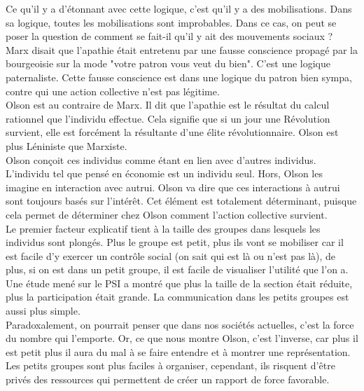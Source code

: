 \documentclass[10pt, a4paper, openany]{book}
\begin{document}
Ce qu'il y a d'étonnant avec cette logique, c'est qu'il y a des mobilisations. Dans sa logique, toutes les mobilisations sont improbables. Dans ce cas, on peut se poser la question de comment se fait-il qu'il y ait des mouvements sociaux ? \\
Marx disait que l'apathie était entretenu par une fausse conscience propagé par la bourgeoisie sur la mode "votre patron vous veut du bien". C'est une logique paternaliste. Cette fausse conscience est dans une logique du patron bien sympa, contre qui une action collective n'est pas légitime. \\
Olson est au contraire de Marx. Il dit que l'apathie est le résultat du calcul rationnel que l'individu effectue. Cela signifie que si un jour une Révolution survient, elle est forcément la résultante d'une élite révolutionnaire. Olson est plus Léniniste que Marxiste. \\
Olson conçoit ces individus comme étant en lien avec d'autres individus. L'individu tel que pensé en économie est un individu seul. Hors, Olson les imagine en interaction avec autrui. Olson va dire que ces interactions à autrui sont toujours basés sur l'intérêt. Cet élément est totalement déterminant, puisque cela permet de déterminer chez Olson comment l'action collective survient. \\
Le premier facteur explicatif tient à la taille des groupes dans lesquels les individus sont plongés. Plus le groupe est petit, plus ils vont se mobiliser car il est facile d'y exercer un contrôle social (on sait qui est là ou n'est pas là), de plus, si on est dans un petit groupe, il est facile de visualiser l'utilité que l'on a. Une étude mené sur le PSI a montré que plus la taille de la section était réduite, plus la participation était grande. La communication dans les petits groupes est aussi plus simple. \\
Paradoxalement, on pourrait penser que dans nos sociétés actuelles, c'est la force du nombre qui l'emporte. Or, ce que nous montre Olson, c'est l'inverse, car plus il est petit plus il aura du mal à se faire entendre et à montrer une représentation. Les petits groupes sont plus faciles à organiser, cependant, ils risquent d'être privés des ressources qui permettent de créer un rapport de force favorable. 
\end{document}
